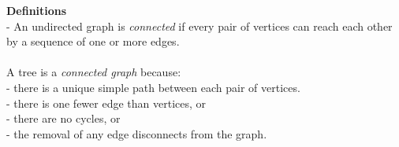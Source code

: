 \documentclass{article}
\begin{document}
\begin{tcolorbox}
    \textbf{Definitions} \\
    - An undirected graph is \emph{connected} if every pair of vertices can reach each other by a sequence of one or more edges.
    \\\\
    A tree is a \emph{connected graph} because: \\
    - there is a unique simple path between each pair of vertices. \\
    - there is one fewer edge than vertices, or \\
    - there are no cycles, or \\
    - the removal of any edge disconnects from the graph.
\end{tcolorbox}
\end{document}
